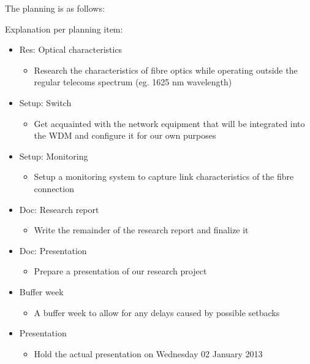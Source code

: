 \documentclass{article}
\begin{document}
The planning is as follows:\\
  \begin{gantt}[xunitlength=50pt]{9}{5}
    \begin{ganttitle}
    \end{ganttitle}
    \begin{ganttitle}
    \end{ganttitle}
  \end{gantt}
\newpage
Explanation per planning item:
\begin{itemize}
  \item Res: Optical characteristics
    \begin{itemize}
      \item Research the characteristics of fibre optics while operating outside the regular telecoms spectrum (eg. 1625 nm wavelength)
    \end{itemize}
  \item Setup: Switch
    \begin{itemize}
      \item Get acquainted with the network equipment that will be integrated into the WDM and configure it for our own purposes
    \end{itemize}
  \item Setup: Monitoring
    \begin{itemize}
      \item Setup a monitoring system to capture link characteristics of the fibre connection
    \end{itemize}
  \item Doc: Research report
    \begin{itemize}
      \item Write the remainder of the research report and finalize it
    \end{itemize}
  \item Doc: Presentation
    \begin{itemize}
      \item Prepare a presentation of our research project
    \end{itemize}
  \item Buffer week
    \begin{itemize}
      \item A buffer week to allow for any delays caused by possible setbacks
    \end{itemize}
  \item Presentation
    \begin{itemize}
      \item Hold the actual presentation on Wednesday 02 January 2013
    \end{itemize}
\end{itemize}




\end{document}
